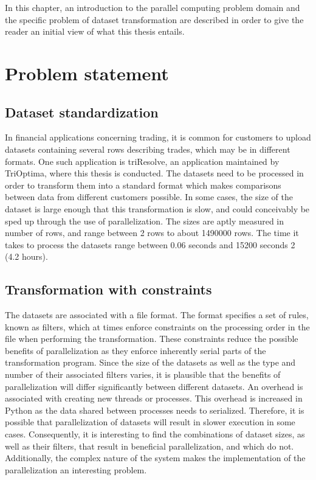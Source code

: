 In this chapter, an introduction to the parallel computing problem domain and the specific problem of dataset transformation are
described in order to give the reader an initial view of what this thesis entails.

\section{Problem statement}
\subsection{Dataset standardization} \label{dataset_standardization}
In financial applications concerning trading, it is common for customers to upload datasets containing several rows
describing trades, which may be in different formats. One such application is triResolve, an application maintained by
TriOptima, where this thesis is conducted.
The datasets need to be processed in order to transform them into a standard format which makes comparisons between data from different customers possible. 
In some cases, the size of the dataset is large enough that this transformation is slow, and could conceivably be sped up through
the use of parallelization. The sizes are aptly measured in number of rows, and range between 2 rows to about 1490000 rows. The time
it takes to process the datasets range between 0.06 seconds and 15200 seconds 2 (4.2 hours).

\subsection{Transformation with constraints}
The datasets are associated with a file format. The format specifies a set of rules, known as filters, which at times enforce
constraints on the processing order in the file when performing the transformation. These constraints reduce the possible benefits of parallelization as they enforce
inherently serial parts of the transformation program.  Since the size of the datasets as well as the type and number of their
associated filters varies, it is plausible that the benefits of parallelization will differ significantly between different datasets.
An overhead is associated with creating new threads or processes.  This overhead is increased in Python as the data shared between processes needs to serialized.
Therefore, it is possible that parallelization of datasets will result in slower execution in some cases. Consequently, it is
interesting to find the combinations of dataset sizes, as well as their filters, that result in beneficial parallelization, and which do not.
Additionally, the complex nature of the system makes the implementation of the parallelization an interesting problem.

